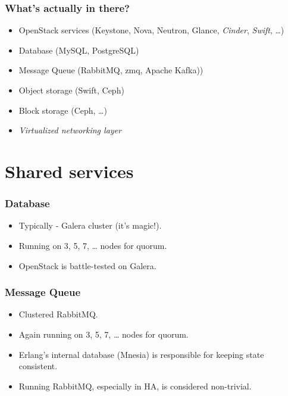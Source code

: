 \documentclass[aspectratio=43]{beamer}
\begin{document}
\begin{frame}
    \frametitle{What's actually in there?}
    \begin{center}
        \begin{itemize}
            \pause
            \item OpenStack services (Keystone, Nova, Neutron, Glance, \emph{Cinder}, \emph{Swift}, …)
            \pause
            \item Database (MySQL, PostgreSQL)
            \pause
            \item Message Queue (RabbitMQ, zmq, Apache Kafka))
            \pause
            \item Object storage (Swift, Ceph)
            \pause
            \item Block storage (Ceph, …)
            \pause
            \item \emph{Virtualized networking layer}
        \end{itemize}
    \end{center}
\end{frame}

\section{Shared services}

\begin{frame}
    \frametitle{Database}
    \begin{center}
        \begin{itemize}
            \item Typically - Galera cluster (it's magic!).
            \item Running on 3, 5, 7, … nodes for quorum.
            \item OpenStack is battle-tested on Galera.
        \end{itemize}
    \end{center}
\end{frame}

\begin{frame}
    \frametitle{Message Queue}
    \begin{center}
        \begin{itemize}
            \item Clustered RabbitMQ.
            \item Again running on 3, 5, 7, … nodes for quorum.
            \item Erlang's internal database (Mnesia) is responsible for keeping state consistent.
            \item Running RabbitMQ, especially in HA, is considered non-trivial.
        \end{itemize}
    \end{center}
\end{frame}
\end{document}
